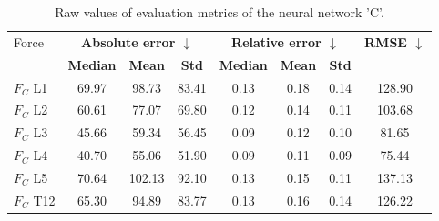 \begin{table}[h]
\centering
\caption{Raw values of evaluation metrics of the neural network 'C'.}
\label{tab:prelim:c.tex}
\begin{tabular}{lccccccc}
\toprule
Force & \multicolumn{3}{c}{\bfseries Absolute error $\downarrow$} & \multicolumn{3}{c}{\bfseries Relative error $\downarrow$} & \bfseries RMSE $\downarrow$ \\
  & \bfseries Median & \bfseries Mean & \bfseries Std & \bfseries Median & \bfseries Mean & \bfseries Std & \bfseries   \\
\midrule
$F_{C}$ L1 & 69.97 & 98.73 & 83.41 & 0.13 & 0.18 & 0.14 & 128.90 \\
$F_{C}$ L2 & 60.61 & 77.07 & 69.80 & 0.12 & 0.14 & 0.11 & 103.68 \\
$F_{C}$ L3 & 45.66 & 59.34 & 56.45 & 0.09 & 0.12 & 0.10 & 81.65 \\
$F_{C}$ L4 & 40.70 & 55.06 & 51.90 & 0.09 & 0.11 & 0.09 & 75.44 \\
$F_{C}$ L5 & 70.64 & 102.13 & 92.10 & 0.13 & 0.15 & 0.11 & 137.13 \\
$F_{C}$ T12 & 65.30 & 94.89 & 83.77 & 0.13 & 0.16 & 0.14 & 126.22 \\
\bottomrule
\end{tabular}
\end{table}
